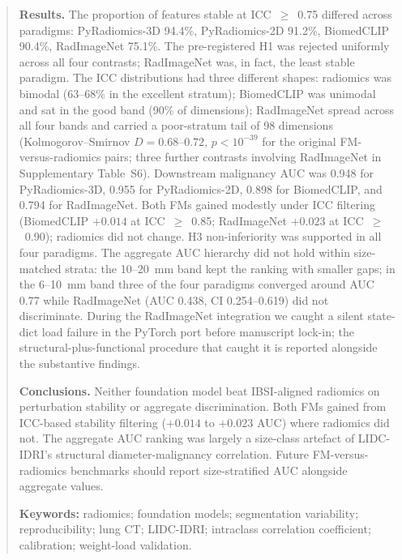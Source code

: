 \begin{abstract}
\noindent\textbf{Results.} The proportion of features stable at ICC~$\geq$~0.75 differed across paradigms: PyRadiomics-3D 94.4\%, PyRadiomics-2D 91.2\%, BiomedCLIP 90.4\%, RadImageNet 75.1\%. The pre-registered H1 was rejected uniformly across all four contrasts; RadImageNet was, in fact, the least stable paradigm. The ICC distributions had three different shapes: radiomics was bimodal (63--68\% in the excellent stratum); BiomedCLIP was unimodal and sat in the good band (90\% of dimensions); RadImageNet spread across all four bands and carried a poor-stratum tail of 98 dimensions (Kolmogorov--Smirnov $D = 0.68$--$0.72$, $p < 10^{-39}$ for the original FM-versus-radiomics pairs; three further contrasts involving RadImageNet in Supplementary Table~S6). Downstream malignancy AUC was 0.948 for PyRadiomics-3D, 0.955 for PyRadiomics-2D, 0.898 for BiomedCLIP, and 0.794 for RadImageNet. Both FMs gained modestly under ICC filtering (BiomedCLIP $+0.014$ at ICC~$\geq$~0.85; RadImageNet $+0.023$ at ICC~$\geq$~0.90); radiomics did not change. H3 non-inferiority was supported in all four paradigms. The aggregate AUC hierarchy did not hold within size-matched strata: the 10--20~mm band kept the ranking with smaller gaps; in the 6--10~mm band three of the four paradigms converged around AUC 0.77 while RadImageNet (AUC 0.438, CI 0.254--0.619) did not discriminate. During the RadImageNet integration we caught a silent state-dict load failure in the PyTorch port before manuscript lock-in; the structural-plus-functional procedure that caught it is reported alongside the substantive findings.

\noindent\textbf{Conclusions.} Neither foundation model beat IBSI-aligned radiomics on perturbation stability or aggregate discrimination. Both FMs gained from ICC-based stability filtering ($+0.014$ to $+0.023$ AUC) where radiomics did not. The aggregate AUC ranking was largely a size-class artefact of LIDC-IDRI's structural diameter-malignancy correlation. Future FM-versus-radiomics benchmarks should report size-stratified AUC alongside aggregate values.

\noindent\textbf{Keywords:} radiomics; foundation models; segmentation variability; reproducibility; lung CT; LIDC-IDRI; intraclass correlation coefficient; calibration; weight-load validation.
\end{abstract}
